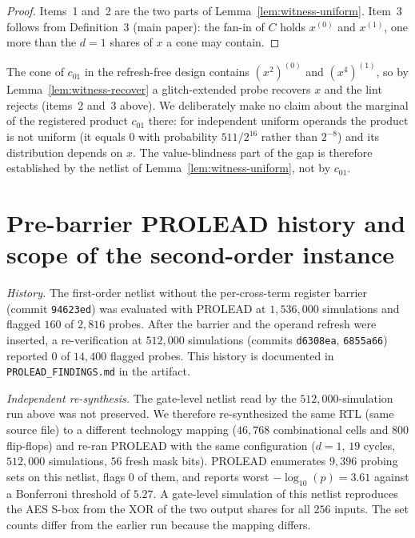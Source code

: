 \documentclass[journal,onecolumn]{IEEEtran}
\begin{document}
\begin{proof}
Items~1 and~2 are the two parts of Lemma~\ref{lem:witness-uniform}.
Item~3 follows from Definition~3 (main paper): the fan-in of $C$ holds
$x^{(0)}$ and $x^{(1)}$, one more than the $d=1$ shares of $x$ a cone
may contain.
\end{proof}

\begin{remark}
\label{rem:witness-it}
The cone of $c_{01}$ in the refresh-free design contains
$(x^{2})^{(0)}$ and $(x^{4})^{(1)}$, so by
Lemma~\ref{lem:witness-recover} a glitch-extended probe recovers $x$
and the lint rejects (items~2 and~3 above). We deliberately make no
claim about the marginal of the registered product $c_{01}$ there:
for independent uniform operands the product is not uniform (it equals
$0$ with probability $511/2^{16}$ rather than $2^{-8}$) and its
distribution depends on $x$. The value-blindness part of the gap is
therefore established by the netlist of
Lemma~\ref{lem:witness-uniform}, not by $c_{01}$.
\end{remark}

\section{Pre-barrier PROLEAD history and scope of the second-order instance}
\label{app:mask-reuse}

\textit{History.}  The first-order netlist without the per-cross-term
register barrier (commit \texttt{94623ed}) was evaluated with PROLEAD at
$1{,}536{,}000$ simulations and flagged $160$ of $2{,}816$ probes.  After
the barrier and the operand refresh were inserted, a re-verification at
$512{,}000$ simulations (commits \texttt{d6308ea}, \texttt{6855a66})
reported $0$ of $14{,}400$ flagged probes.  This history is documented in
\texttt{PROLEAD\_\allowbreak{}FINDINGS.md} in the artifact.
\label{app:prolead-findings-historical}

\textit{Independent re-synthesis.}  The gate-level netlist read by the
$512{,}000$-simulation run above was not preserved.  We therefore
re-synthesized the same RTL (same source file) to a different technology
mapping ($46{,}768$ combinational cells and $800$ flip-flops) and re-ran
PROLEAD with the same configuration ($d{=}1$, $19$ cycles, $512{,}000$
simulations, $56$ fresh mask bits).  PROLEAD enumerates $9{,}396$ probing
sets on this netlist, flags $0$ of them, and reports worst
$-\log_{10}(p)=3.61$ against a Bonferroni threshold of $5.27$.  A
gate-level simulation of this netlist reproduces the AES S-box from the XOR
of the two output shares for all $256$ inputs.  The set counts differ from
the earlier run because the mapping differs.
\end{document}
